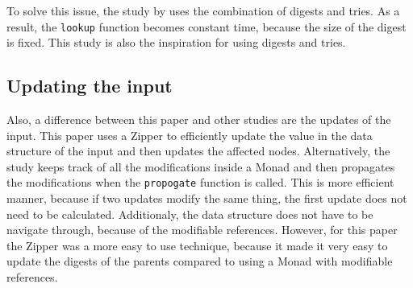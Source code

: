 To solve this issue, the study  by \citeauthor[]{miraldo2019efficient} uses the combination of digests and tries. As a result, the \texttt{lookup} function becomes constant time, because the size of the digest is fixed. This study is also the inspiration for using digests and tries.

\subsection{Updating the input}
Also, a difference between this paper and other studies are the updates of the input. This paper uses a Zipper to efficiently update the value in the data structure of the input and then updates the affected nodes. Alternatively, the study \cite{carlsson2002monads} keeps track of all the modifications inside a Monad and then propagates the modifications when the \texttt{propogate} function is called. This is more efficient manner, because if two updates modify the same thing, the first update does not need to be calculated. Additionaly, the data structure does not have to be navigate through, because of the modifiable references. However, for this paper the Zipper was a more easy to use technique, because it made it very easy to update the digests of the parents compared to using a Monad with modifiable references.